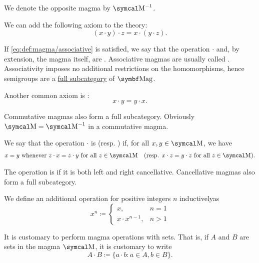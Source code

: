 \begin{definition}
\begin{DefEnum}
    We denote the opposite magma by \( \CM^{-1} \).

     We can add the following axiom to the theory:
    \begin{equation}\label{eq:def:magma/associative}
      (x \cdot y) \cdot z = x \cdot (y \cdot z).
    \end{equation}

    If \eqref{eq:def:magma/associative} is satisfied, we say that the operation \( \cdot \) and, by extension, the magma itself, are . Associative magmas are usually called . Associativity imposes no additional restrictions on the homomorphisms, hence semigroups are a \hyperref[def:subcategory]{full subcategory} of \( \Cat{Mag} \).

     Another common axiom is :
    \begin{equation}\label{eq:def:magma/commutative}
      x \cdot y = y \cdot x.
    \end{equation}

    Commutative magmas also form a full subcategory. Obviously \( \CM = \CM^{-1} \) in a commutative magma.

     We say that the operation \( \cdot \) is  (resp. ) if, for all \( x, y \in \CM \), we have
    \begin{align}\label{eq:def:magma/cancellative}
      x = y \T{whenever} z \cdot x = z \cdot y \T{for all} z \in \CM
      &&
      (\text{resp. } x \cdot z = y \cdot z \T{for all} z \in \CM).
    \end{align}

    The operation is  if it is both left and right cancellative. Cancellative magmas also form a full subcategory.

     We define an additional  operation for positive integers \( n \) inductively\IND as
    \begin{equation}\label{eq:def:magma/exponentiation}
      x^n \coloneqq \begin{cases}
        x,               & n = 1 \\
        x \cdot x^{n-1}, & n > 1
      \end{cases}
    \end{equation}

     It is customary to perform magma operations with sets. That is, if \( A \) and \( B \) are sets in the magma \( \CM \), it is customary to write
    \begin{equation*}
      A \cdot B \coloneqq \{ a \cdot b \colon a \in A, b \in B \}.
    \end{equation*}


\end{DefEnum}
\end{definition}
